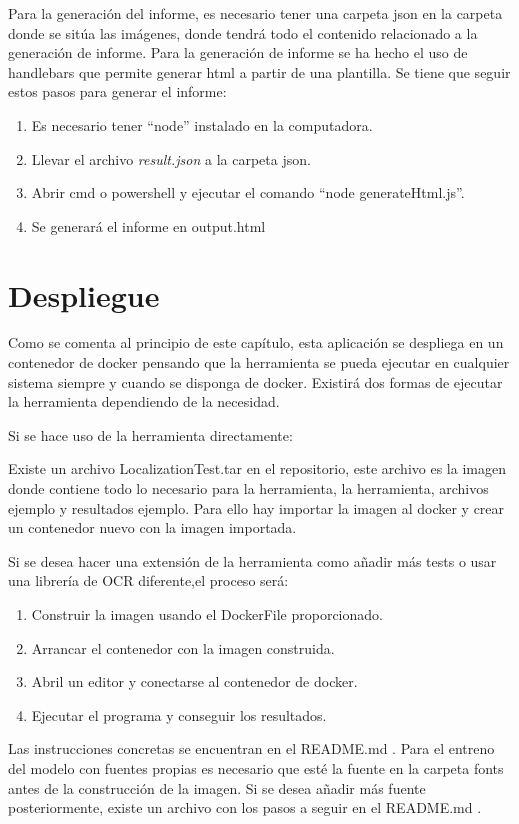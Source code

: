 Para la generación del informe, es necesario tener una carpeta json en la carpeta donde se sitúa las imágenes, donde tendrá todo el contenido relacionado a la generación de informe. Para la generación de informe se ha hecho el uso de handlebars que permite generar html a partir de una plantilla. Se tiene que seguir estos pasos para generar el informe:
\begin{enumerate}
	\item Es necesario tener ``node'' instalado en la computadora.
	\item Llevar el archivo \textit{result.json} a la carpeta json.
	\item Abrir cmd o powershell y ejecutar el comando ``node generateHtml.js''.
	\item Se generará el informe en output.html
\end{enumerate}
\section{Despliegue}
Como se comenta al principio de este capítulo, esta aplicación se despliega en un contenedor de docker pensando que la herramienta se pueda ejecutar en cualquier sistema siempre y cuando se disponga de docker.
Existirá dos formas de ejecutar la herramienta dependiendo de la necesidad.

Si se hace uso de la herramienta directamente:

Existe un archivo LocalizationTest.tar en el repositorio, este archivo es la imagen donde contiene todo lo necesario para la herramienta, la herramienta, archivos ejemplo y resultados ejemplo. Para ello hay importar la imagen al docker y crear un contenedor nuevo con la imagen importada.

Si se desea hacer una extensión de la herramienta como añadir más tests o usar una librería de OCR diferente,el proceso será:
\begin{enumerate}
	\item Construir la imagen usando el DockerFile proporcionado.
	\item Arrancar el contenedor con la imagen construida.
	\item Abril un editor y conectarse al contenedor de docker.
	\item Ejecutar el programa y conseguir los resultados.
\end{enumerate}
Las instrucciones concretas se encuentran en el README.md .
Para el entreno del modelo con fuentes propias es necesario que esté la fuente en la carpeta fonts antes de la construcción de la imagen. Si se desea añadir más fuente posteriormente, existe un archivo con los pasos a seguir en el README.md .


